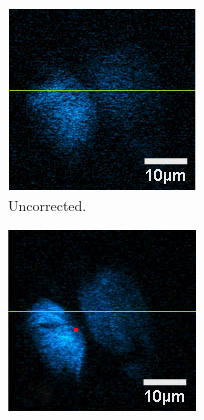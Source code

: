 \begin{figure}[tbh]
			\centering
			\begin{subfigure}[b]{0.20\textwidth}
							\includegraphics[width=\textwidth]{images/elegance_uncorrected}
							\caption{Uncorrected.}
							\label{fig:elegance_uncorrected}
			\end{subfigure}
			\begin{subfigure}[b]{0.20\textwidth}
							\includegraphics[width=\textwidth]{images/elegance_coupling_cor}

\end{subfigure}
\end{figure}
